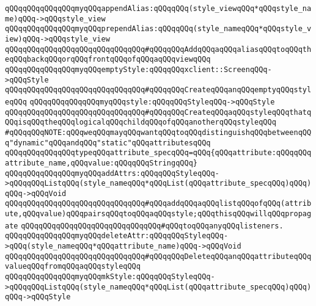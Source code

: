 \newline
\verb|qQQqqQQqqQQqqQQqmyqQQqappendAlias:qQQqqQQq(style_viewqQQq*qQQqstyle_name)qQQq->qQQqstyle_view|\newline
\verb|qQQqqQQqqQQqqQQqmyqQQqprependAlias:qQQqqQQq(style_nameqQQq*qQQqstyle_view)qQQq->qQQqstyle_view|\newline
\verb|qQQqqQQqqQQqqQQqqQQqqQQqqQQqqQQq#qQQqqQQqAddqQQqaqQQqaliasqQQqtoqQQqtheqQQqbackqQQqorqQQqfrontqQQqofqQQqaqQQqviewqQQq|\newline
\newline
\verb|qQQqqQQqqQQqqQQqmyqQQqemptyStyle:qQQqqQQqxclient::ScreenqQQq->qQQqStyle|\newline
\verb|qQQqqQQqqQQqqQQqqQQqqQQqqQQqqQQq#qQQqqQQqCreateqQQqanqQQqemptyqQQqstyleqQQq|\newline
\newline
\verb|qQQqqQQqqQQqqQQqmyqQQqstyle:qQQqqQQqStyleqQQq->qQQqStyle|\newline
\verb|qQQqqQQqqQQqqQQqqQQqqQQqqQQqqQQq#qQQqqQQqCreateqQQqaqQQqstyleqQQqthatqQQqisqQQqtheqQQqlogicalqQQqchildqQQqofqQQqanotherqQQqstyleqQQq|\newline
\newline
\verb|#qQQqqQQqNOTE:qQQqweqQQqmayqQQqwantqQQqtoqQQqdistinguishqQQqbetweenqQQq"dynamic"qQQqandqQQq"static"qQQqattributesqQQq|\newline
\newline
\verb|qQQqqQQqqQQqqQQqtypeqQQqattribute_specqQQq=qQQq{qQQqattribute:qQQqqQQqattribute_name,qQQqvalue:qQQqqQQqStringqQQq}|\newline
\newline
\verb|qQQqqQQqqQQqqQQqmyqQQqaddAttrs:qQQqqQQqStyleqQQq->qQQqqQQqListqQQq(style_nameqQQq*qQQqList(qQQqattribute_specqQQq)qQQq)qQQq->qQQqVoid|\newline
\verb|qQQqqQQqqQQqqQQqqQQqqQQqqQQqqQQq#qQQqaddqQQqaqQQqlistqQQqofqQQq(attribute,qQQqvalue)qQQqpairsqQQqtoqQQqaqQQqstyle;qQQqthisqQQqwillqQQqpropagate|\newline
\verb|qQQqqQQqqQQqqQQqqQQqqQQqqQQqqQQq#qQQqtoqQQqanyqQQqlisteners.|\newline
\newline
\verb|qQQqqQQqqQQqqQQqmyqQQqdeleteAttr:qQQqqQQqStyleqQQq->qQQq(style_nameqQQq*qQQqattribute_name)qQQq->qQQqVoid|\newline
\verb|qQQqqQQqqQQqqQQqqQQqqQQqqQQqqQQq#qQQqqQQqDeleteqQQqanqQQqattributeqQQqvalueqQQqfromqQQqaqQQqstyleqQQq|\newline
\newline
\verb|qQQqqQQqqQQqqQQqmyqQQqmkStyle:qQQqqQQqStyleqQQq->qQQqqQQqListqQQq(style_nameqQQq*qQQqList(qQQqattribute_specqQQq)qQQq)qQQq->qQQqStyle|\newline
